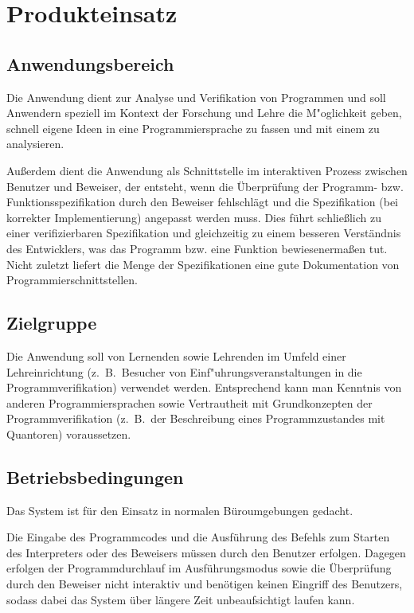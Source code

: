 \section{Produkteinsatz}%

\subsection{Anwendungsbereich}%

Die Anwendung dient zur Analyse und Verifikation von Programmen und soll Anwendern speziell im Kontext der Forschung und Lehre die M"oglichkeit geben, schnell eigene Ideen in eine Programmiersprache zu fassen und mit einem  zu analysieren.%

Außerdem dient die Anwendung als Schnittstelle im interaktiven Prozess zwischen Benutzer und Beweiser, der entsteht, wenn die Überprüfung der Programm- bzw. Funktionsspezifikation durch den Beweiser fehlschlägt und die Spezifikation (bei korrekter Implementierung) angepasst werden muss. Dies führt schließlich zu einer verifizierbaren Spezifikation und gleichzeitig zu einem besseren Verständnis des Entwicklers, was das Programm bzw. eine Funktion bewiesenermaßen tut. Nicht zuletzt liefert die Menge der Spezifikationen eine gute Dokumentation von Programmierschnittstellen.%

\subsection{Zielgruppe}%

Die Anwendung soll von Lernenden sowie Lehrenden im Umfeld einer Lehreinrichtung (z.~B.\ Besucher von Einf"uhrungsveranstaltungen in die Programmverifikation) verwendet werden. Entsprechend kann man Kenntnis von anderen Programmiersprachen sowie Vertrautheit mit Grundkonzepten der Programmverifikation (z.~B.\ der Beschreibung eines Programmzustandes mit Quantoren) voraussetzen.%

\subsection{Betriebsbedingungen}%

Das System ist für den Einsatz in normalen Büroumgebungen gedacht.

Die Eingabe des Programmcodes und die Ausführung des Befehls zum Starten des Interpreters oder des Beweisers müssen durch den Benutzer erfolgen. Dagegen erfolgen der Programmdurchlauf im Ausführungsmodus sowie die Überprüfung durch den Beweiser nicht interaktiv und benötigen keinen Eingriff des Benutzers, sodass dabei das System über längere Zeit unbeaufsichtigt laufen kann.